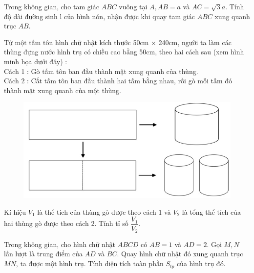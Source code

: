 \begin{vnmultiplechoice}[ rearrange=yes, keycolumns=5]
\begin{question}%
Trong không gian, cho tam giác $ABC$ vuông tại $A, AB = a$ và   $AC=\sqrt3 a$. Tính
độ dài đường sinh l của hình nón, nhận được khi quay tam giác $ABC$ xung quanh trục $AB$.
\datcot
\bonpa
{}
{}
{}
{}
\end{question}

\begin{question} %
Từ một tấm tôn hình chữ nhật kích thước 50cm $\times$ 240cm, người ta làm các
thùng đựng nước hình trụ có chiều cao bằng 50cm, theo hai cách sau (xem hình minh
họa dưới đây) :\\
 Cách 1 : Gò tấm tôn ban đầu thành mặt xung quanh của thùng.
\\ 
 Cách 2 : Cắt tấm tôn ban đầu thành hai tấm bằng nhau, rồi gò mỗi tấm đó thành mặt
xung quanh của một thùng.

\begin{figure}
\examvspace*{-.5cm}
\includegraphics[scale =0.5]{toan05}
\end{figure}
Kí hiệu $V_1$ là thể tích của thùng gò được theo cách 1 và
$V_2$ là tổng thể tích của hai thùng
gò được theo cách 2. Tính tỉ số $\dfrac{V_1}{V_2}$.
\datcot
\bonpa
{}
{}
{}
{}
\end{question}

\begin{question} %
Trong không gian, cho hình chữ nhật $ABCD$ có $AB = 1$ và $AD = 2.$ Gọi $M, N$
lần lượt là trung điểm của $AD$ và $BC$. Quay hình chữ nhật đó xung quanh trục $MN$, ta
được một hình trụ. Tính diện tích toàn phần $S_{tp} $ của hình trụ đó.
\datcot
\bonpa
{}
{}
{}
{}
\end{question}


\end{vnmultiplechoice}
